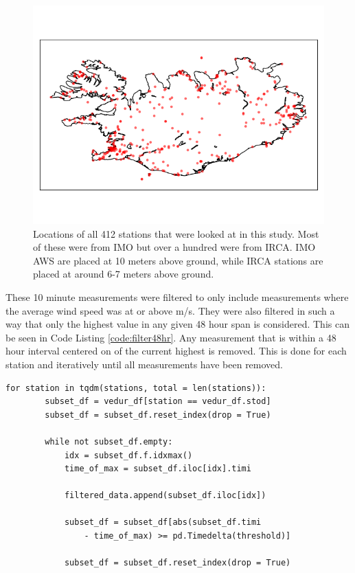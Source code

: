\begin{figure}
    \centering
    \includegraphics[scale = 0.75]{Figures/weather_stations_2024-04-09.png}
    \caption[Locations of automatic weather stations in Iceland]{Locations of all 412 stations that were looked at in this study. Most of these were from IMO but over a hundred were from IRCA. IMO AWS are placed at 10 meters above ground, while IRCA stations are placed at around 6-7 meters above ground.}
    \label{fig:aws_map}
\end{figure}

These 10 minute measurements were filtered to only include measurements where the average wind speed was at or above \averageWindSpeedLimit m/s. They were also filtered in such a way that only the highest value in any given 48 hour span is considered. This can be seen in Code Listing \ref{code:filter48hr}. Any measurement that is within a 48 hour interval centered on of the current highest is removed. This is done for each station and iteratively until all measurements have been removed.

\begin{lstlisting}[style = Python, caption = {[Filter points over 48 hour interval] Filter all measured points so to only keep the highest value in any 48 hour interval for a given station. For a given station, the highest wind speed recorded is selected. Then any measurement in a 48 hour interval, centered on the highest wind speed, for that given station, is removed. This is then done iteratively until we are left with an empty dataframe.}, label = code:filter48hr]
    for station in tqdm(stations, total = len(stations)):
        subset_df = vedur_df[station == vedur_df.stod]
        subset_df = subset_df.reset_index(drop = True)

        while not subset_df.empty:
            idx = subset_df.f.idxmax()
            time_of_max = subset_df.iloc[idx].timi

            filtered_data.append(subset_df.iloc[idx])

            subset_df = subset_df[abs(subset_df.timi 
                - time_of_max) >= pd.Timedelta(threshold)]

            subset_df = subset_df.reset_index(drop = True)  
\end{lstlisting}

